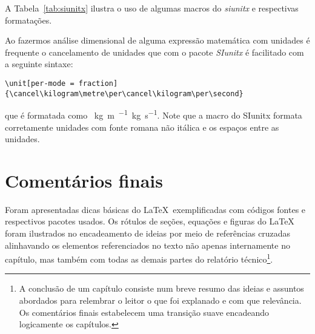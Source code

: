 A Tabela~\ref{tab:siunitx} ilustra o uso de algumas macros do \emph{siunitx} e respectivas formatações. 

Ao fazermos análise dimensional de alguma expressão matemática com unidades é frequente  o cancelamento de unidades que com o pacote \emph{SIunitx}  é facilitado com a seguinte sintaxe:

\verb|\unit[per-mode = fraction] {\cancel\kilogram\metre\per\cancel\kilogram\per\second} | 

que é formatada como  \unit[per-mode = fraction] {\cancel\kilogram\metre\per\cancel\kilogram\per\second}. Note que a macro do SIunitx  formata corretamente unidades com fonte romana não itálica e os espaços entre as unidades.



\section{Comentários finais}

Foram apresentadas  dicas básicas do \LaTeX\, exemplificadas com códigos fontes e respectivos pacotes usados. Os rótulos de seções, equações e figuras do \LaTeX\, foram ilustrados  no encadeamento de ideias por meio de referências cruzadas alinhavando os elementos referenciados no texto não apenas internamente no capítulo, mas também com todas as demais partes do relatório técnico\footnote{A conclusão de um capítulo consiste num breve resumo das ideias e assuntos abordados para relembrar o leitor o que foi explanado e com que relevância. Os comentários finais estabelecem uma transição suave encadeando logicamente os capítulos.}.